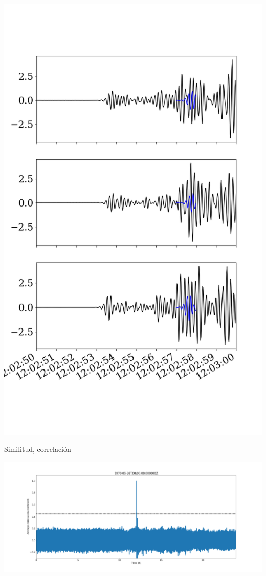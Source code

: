 \documentclass{beamer}
\begin{document}
\begin{frame}
\begin{minipage}{0.4\linewidth}
    \includegraphics[width=1.2\linewidth]{images/fig_7.png}
 \end{minipage}
 
\end{frame}

\begin{frame}
 {Similitud, correlaci\'on}

 \includegraphics[width=1\linewidth]{images/cc_sum.png}
 
\end{frame}
\end{document}
